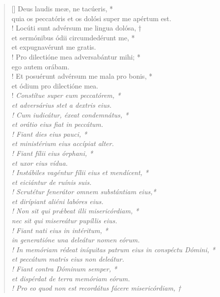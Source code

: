 \begin{verse}[\versewidth]
Deus laudis meæ, ne tacúeris, *\\
quia os peccatóris \verselinebreak et os dolósi super me apértum est.\\!
\vin  Locúti sunt advérsum me lingua dolósa, †\\
\vin  et sermónibus ódii circumdedérunt me, *\\
\vin  et expugnavérunt me gratis.\\!
Pro dilectióne mea adversabántur mihi; *\\
ego autem orábam.\\!
\vin  Et posuérunt advérsum me mala pro bonis, *\\
\vin  et ódium pro dilectióne mea.\\!
\textit{
Constítue super eum peccatórem, *\\
et adversárius stet a dextris eius.\\!
\vin  Cum iudicátur, éxeat condemnátus, *\\
\vin  et orátio eius fiat in peccátum.\\! \pagebreak
Fiant dies eius pauci, *\\
et ministérium eius accípiat alter.\\!
\vin  Fiant fílii eius órphani, *\\
\vin  et uxor eius vídua.\\!
Instábiles vagéntur fílii eius et mendícent, *\\
et eiciántur de ruínis suis.\\!
\vin  Scrutétur fenerátor omnem substántiam eius,*\\
\vin  et dirípiant aliéni labóres eius.\\!
Non sit qui prǽbeat illi misericórdiam, *\\
nec sit qui misereátur pupíllis eius.\\!
\vin  Fiant nati eius in intéritum, *\\
\vin  in generatióne una deleátur nomen eórum.\\!
In memóriam rédeat iníquitas \verselinebreak patrum eius in conspéctu Dómini, *\\
et peccátum matris eius non deleátur.\\!
\vin  Fiant contra Dóminum semper, *\\
\vin  et dispérdat de terra memóriam eórum.\\! 
Pro eo quod non est \verselinebreak recordátus fácere misericórdiam, †\\
}
\end{verse}
